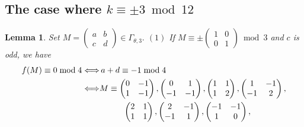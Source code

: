 \documentclass[12pt]{article}
\theoremstyle{definition}
\newtheorem{lemma}[theorem]{Lemma}
\numberwithin{equation}{section}
\numberwithin{theorem}{section}
\begin{document}
\subsection{The case where $k\equiv \pm 3 \bmod{12}$}







\begin{lemma}
\label{lem:level3-mod4}
{\it
Set 
$
M=
\begin{pmatrix}
a & b \\
c & d
\end{pmatrix}
\in\Gamma_{\theta,3}.
$
\newline
$\mathrm{(1)}$ If 
$
M
\equiv
\pm
\begin{pmatrix}
1 & 0 \\
0 & 1
\end{pmatrix}
\bmod{3}
$ 
and $c$ is odd, 
we have 
\begin{align}
f(M)\equiv 0 \bmod{4} 
\Longleftrightarrow&
\, a+d\equiv -1 \bmod{4} \notag  \\
\Longleftrightarrow&
M
\equiv
\begin{pmatrix}
0 & -1 \\
1 & -1
\end{pmatrix}, 
\begin{pmatrix}
0 & 1 \\
-1 & -1
\end{pmatrix}, 
\begin{pmatrix}
1 & 1 \\
1 & 2
\end{pmatrix}, 
\begin{pmatrix}
1 & -1 \\
-1 & 2
\end{pmatrix},  \notag \\
&\hspace{10mm}
\begin{pmatrix}
2 & 1 \\
1 & 1
\end{pmatrix}, 
\begin{pmatrix}
2 & -1 \\
-1 & 1
\end{pmatrix}, 
\begin{pmatrix}
-1 & -1 \\
1 & 0
\end{pmatrix}, 

\end{align}}
\end{lemma}
\end{document}
